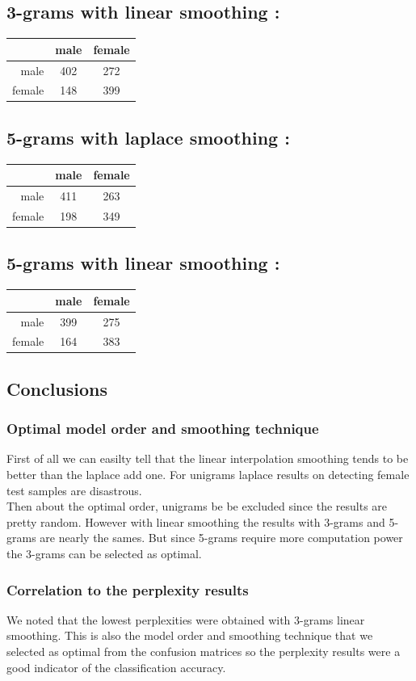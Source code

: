 \documentclass{eplDoc}
\begin{document}
\subsection{3-grams with linear smoothing :} 
\begin{tabular}{|r|c|c|} 
\hline 
 & male & female \\ 
\hline 
male & 402 & 272 \\ 
female & 148 & 399 \\ 
\hline 
\end{tabular} 
\subsection{5-grams with laplace smoothing :} 
\begin{tabular}{|r|c|c|} 
\hline 
 & male & female \\ 
\hline 
male & 411 & 263 \\ 
female & 198 & 349 \\ 
\hline 
\end{tabular} 
\subsection{5-grams with linear smoothing :} 
\begin{tabular}{|r|c|c|} 
\hline 
 & male & female \\ 
\hline 
male & 399 & 275 \\ 
female & 164 & 383 \\ 
\hline 
\end{tabular} 

\subsection{Conclusions}
\subsubsection{Optimal model order and smoothing technique} 

First of all we can easilty tell that the linear interpolation smoothing tends to be better than the laplace add one. For unigrams laplace results on detecting female test samples are disastrous. \\ 
Then about the optimal order, unigrams be be excluded since the results are pretty random. However with linear smoothing the results with 3-grams and 5-grams are nearly the sames. But since 5-grams require more computation power the 3-grams can be selected as optimal. 
 

\subsubsection{Correlation to the perplexity results}

We noted that the lowest perplexities were obtained with 3-grams linear smoothing. This is also the model order and smoothing technique that we selected as optimal from the confusion matrices so the perplexity results were a good indicator of the classification accuracy. 
\end{document}
